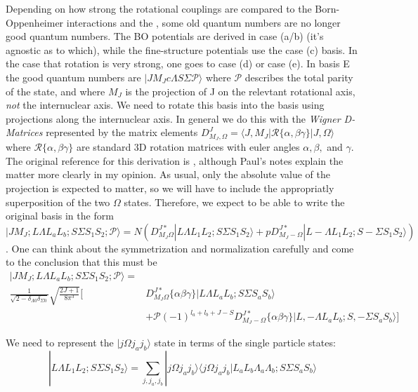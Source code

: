 \documentclass[prl, longbibliography]{revtex4-2}
\begin{document}
Depending on how strong the rotational couplings are compared to the Born-Oppenheimer interactions and the , some old quantum numbers are no longer good quantum numbers. The BO potentials are derived in case (a/b) (it's agnostic as to which), while the fine-structure potentials use the case (c) basis. 
In the case that rotation is very strong, one goes to case (d) or case (e). In basis E the good quantum numbers are $|J M_J c \Lambda S \Sigma \mathcal{P} \rangle $ where $\mathcal{P}$ describes the total parity of the state, and where $M_J$ is the projection of J on the relevtant rotational axis, \emph{not} the internuclear axis. 
We need to rotate this basis into the basis using projections along the internuclear axis. In general we do this with the \emph{Wigner D-Matrices} represented by the matrix elements $D^J_{M_J,\Omega}=\langle J,M_J|\mathcal{R}\{\alpha,\beta\gamma\}|J, \Omega\rangle$ where $\mathcal{R}\{\alpha,\beta\gamma\}$ are standard 3D rotation matrices with euler angles $\alpha, \beta,$ and $\gamma$. The original reference for this derivation is \cite{singer_theory_1983}, although Paul's notes explain the matter more clearly in my opinion. 
As usual, only the absolute value of the projection is expected to matter, so we will have to include the appropriatly superposition of the two $\Omega$ states. 
Therefore, we expect to be able to write the original basis in the form $|J M_J; L \Lambda L_a L_b; S \Sigma  S_1 S_2; \mathcal{P} \rangle=N(D^{J*}_{M_J\Omega}|L \Lambda L_1 L_2; S \Sigma S_1 S_2\rangle+pD^{J*}_{M_J-\Omega}|L -\Lambda L_1 L_2; S -\Sigma S_1 S_2\rangle)$. One can think about the symmetrization and normalization carefully and come to the conclusion that this must be
\begin{equation}
\begin{split}
|J M_J; L \Lambda L_a L_b; S \Sigma  S_1 S_2; \mathcal{P} \rangle=\\
\frac{1}{\sqrt{2-\delta_{\Lambda 0}\delta_{\Sigma 0}}}\sqrt{\frac{2J+1}{8\pi^3}}\bigg[&D^{J*}_{M_J\Omega}\{\alpha \beta \gamma\}|L \Lambda L_a L_b; S \Sigma S_a S_b\rangle\\
&+\mathcal{P}(-1)^{l_a+l_b+J-S}D^{J*}_{M_J-\Omega}\{\alpha \beta \gamma\}|L, -\Lambda L_a L_b; S, -\Sigma S_a S_b\rangle\bigg]
\end{split}
\end{equation}

We need to represent the $|j\Omega j_a j_b\rangle$ state in terms of the single particle states:
\begin{equation}
|L \Lambda L_1 L_2; S \Sigma S_1 S_2\rangle = \sum_{j, j_a, j_b} |j\Omega j_a j_b\rangle\langle j\Omega j_a j_b | L_a L_b \Lambda_a \Lambda_b; S\Sigma S_a S_b\rangle
\end{equation}
\end{document}
